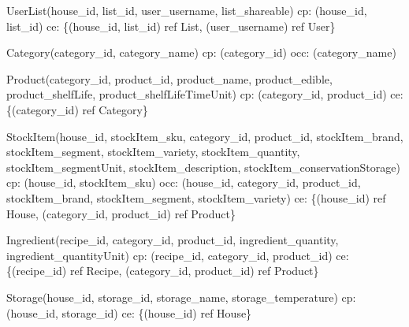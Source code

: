 {\begin{description}
		\item UserList(house\_id, list\_id, user\_username, list\_shareable)
		\newline
		\acrshort{cp}: (house\_id, list\_id) \newline
		\acrshort{ce}: \{(house\_id, list\_id) ref List, (user\_username) ref User\}
		
		\item Category(category\_id, category\_name)
		\newline
		\acrshort{cp}: (category\_id) \newline
		\acrshort{occ}: (category\_name)
		
		\item Product(category\_id, product\_id, product\_name, product\_edible, product\_shelfLife, \newline product\_shelfLifeTimeUnit) \newline
		\acrshort{cp}: (category\_id, product\_id) \newline
		\acrshort{ce}: \{(category\_id) ref Category\}
		
		\item StockItem(house\_id, stockItem\_sku, category\_id, product\_id, stockItem\_brand, stockItem\_segment, stockItem\_variety, stockItem\_quantity, stockItem\_segmentUnit, stockItem\_description, stockItem\_conservationStorage) \newline
		\acrshort{cp}: (house\_id, stockItem\_sku) \newline
		\acrshort{occ}: (house\_id, category\_id, product\_id, stockItem\_brand, stockItem\_segment, \newline stockItem\_variety) \newline
		\acrshort{ce}: \{(house\_id) ref House, (category\_id, product\_id) ref Product\}
		
		\item Ingredient(recipe\_id, category\_id, product\_id, ingredient\_quantity, ingredient\_quantityUnit) \newline
		\acrshort{cp}: (recipe\_id, category\_id, product\_id) \newline
		\acrshort{ce}: \{(recipe\_id) ref Recipe, (category\_id, product\_id) ref Product\}
		
		\item Storage(house\_id, storage\_id, storage\_name, storage\_temperature)  \newline
		\acrshort{cp}:(house\_id, storage\_id) \newline
		\acrshort{ce}: \{(house\_id) ref House\}
		

\end{description}}
